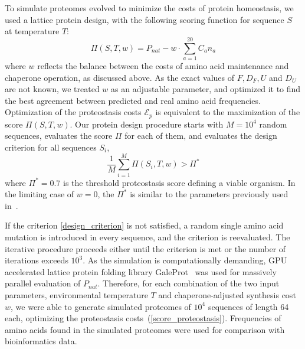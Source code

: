 \documentclass[10pt,letterpaper]{article}
\begin{document}
To simulate proteomes evolved to minimize the costs of protein homeostasis, we used a lattice protein design, with the following scoring function for sequence $S$ at temperature $T$:
\begin{equation}
	\label{score_proteostasis}
	\Pi(S,T,w) = P_{nat} - w\cdot\sum\limits_{a=1}^{20}C_{a}n_{a}
\end{equation}
where $w$ reflects the balance between the costs of amino acid maintenance and chaperone operation, as discussed above. As the exact values of $F,D_{F},U$ and $D_{U}$ are not known, we treated $w$ as an adjustable parameter, and optimized it to find the best agreement between predicted and real amino acid frequencies. Optimization of the proteostasis costs $\mathcal{E}_{p}$ is equivalent to the maximization of the score $\Pi(S,T,w)$. Our protein design procedure starts with $M=10^{4}$ random sequences, evaluates the score $\Pi$ for each of them, and evaluates the design criterion for all sequences $S_i$,
\begin{equation}
	\label{design_criterion}
	\frac{1}{M}\sum\limits_{i=1}^{M}\Pi(S_{i},T,w) > \Pi^*
\end{equation}
where $\Pi^*=0.7$ is the threshold proteostasis score defining a viable organism. In the limiting case of $w=0$, the $\Pi^*$ is similar to the parameters previously used in~\cite{Zeldovich2007First}. 

If the criterion \eqref{design_criterion} is not satisfied, a random single amino acid mutation is introduced in every sequence, and the criterion is reevaluated. The iterative procedure proceeds either until the criterion is met or the number of iterations exceeds $10^{3}$. As the simulation is computationally demanding, GPU accelerated lattice protein folding library GaleProt~\cite{Venev2015Massively} was used for massively parallel evaluation of $P_{nat}$. Therefore, for each combination of the two input parameters, environmental temperature $T$ and chaperone-adjusted synthesis cost $w$, we were able to generate simulated proteomes of $10^4$ sequences of length 64 each, optimizing the proteostasis costs~(\ref{score_proteostasis}). Frequencies of amino acids found in the simulated proteomes were used for comparison with bioinformatics data.
\end{document}
